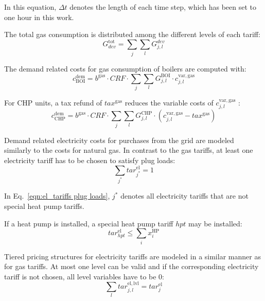 In this equation, $\Delta t$ denotes the length of each time step, which has been set to one hour in this work.

The total gas consumption is distributed among the different levels of each tariff:
\begin{equation}
	G^\mathrm{tot}_{dev} = \sum\limits_{j} \sum\limits_{l} G^{dev}_{j,l}
\end{equation}

The demand related costs for gas consumption of boilers are computed with:
\begin{equation}
	c^{\mathrm{dem}}_{\mathrm{BOI}} = b^{\mathrm{gas}} \cdot CRF \cdot \sum\limits_{j} \sum\limits_{l} G^\mathrm{BOI}_{j,l} \cdot c^\mathrm{var,gas}_{j,l}
\end{equation}

For CHP units, a tax refund of $tax^{\mathrm{gas}}$ reduces the variable costs of $c^\mathrm{var,gas}_{j,l}$ \cite{EStG2015}:
\begin{equation}
	c^{\mathrm{dem}}_{\mathrm{CHP}} = b^{\mathrm{gas}} \cdot CRF \cdot \sum\limits_{j} \sum\limits_{l} G^\mathrm{CHP}_{j,l} \cdot \left( c^\mathrm{var,gas}_{j,l} - tax^{\mathrm{gas}} \right)
\end{equation}

Demand related electricity costs for purchases from the grid are modeled similarly to the costs for natural gas.
In contrast to the gas tariffs, at least one electricity tariff has to be chosen to satisfy plug loads:
\begin{equation}
	\sum\limits_{j^*} tar^{\mathrm{el}}_{j^*} = 1
	\label{eqn:el_tariffs plug loads}
\end{equation}

In Eq.~\ref{eqn:el_tariffs plug loads}, $j^*$ denotes all electricity tariffs that are not special heat pump tariffs.

If a heat pump is installed, a special heat pump tariff $hpt$ may be installed:
\begin{equation}
	tar^{\mathrm{el}}_{hpt} \le \sum\limits_{i} x_{i}^\mathrm{HP}
\end{equation}


Tiered pricing structures for electricity tariffs are modeled in a similar manner as for gas tariffs.
At most one level can be valid and if the corresponding electricity tariff is not chosen, all level variables have to be 0:
\begin{equation}
\sum\limits_{l} tar^\mathrm{el,lvl}_{j,l} = tar^\mathrm{el}_{j}
\end{equation}

